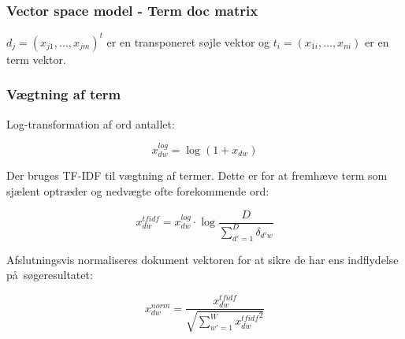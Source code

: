 \documentclass[xcolor=table]{beamer}
\begin{document}
\begin{frame}

  \frametitle{Vector space model - Term doc matrix}

  \begin{center}
  \end{center}

  $d_j = (x_{j1}, \ldots, x_{jm})^t$ er en transponeret s\o jle vektor og $t_i = (x_{1i}, \ldots, x_{ni})$ er en term vektor.

\end{frame}

\begin{frame}

  \frametitle{V\ae gtning af term}

  Log-transformation af ord antallet:

  \[
  x_{dw}^{log} = \log{(1 + x_{dw})}
  \]

  Der bruges TF-IDF til v\ae gtning af termer. Dette er for at fremh\ae ve term som sj\ae lent optr\ae der og nedv\ae gte ofte forekommende ord:

  \[
  x_{dw}^{tfidf} = x_{dw}^{log} \cdot \log{\frac{D}{\sum_{d\prime = 1}^{D}\delta_{d\prime w}}}
  \]

  Afslutningsvis normaliseres dokument vektoren for at sikre de har ens indflydelse p\aa\ s\o geresultatet:

  \[
  x_{dw}^{norm} = \frac{x_{dw}^{tfidf}}{\sqrt{\sum_{w\prime = 1}^{W} {x_{dw}^{tfidf}}^{2}}}
  \]

\end{frame}
\end{document}
